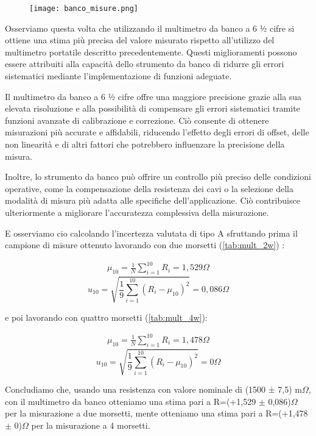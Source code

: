 \begin{figure}[h]
    \centering
    \texttt{[image: banco\_misure.png]}
    \label{fig:range}
\end{figure}
\FloatBarrier

Osserviamo questa volta che utilizzando il multimetro da banco a 6 ½ cifre si ottiene una stima più precisa del valore misurato rispetto all'utilizzo del multimetro portatile descritto precedentemente. Questi miglioramenti possono essere attribuiti alla capacità dello strumento da banco di ridurre gli errori sistematici mediante l'implementazione di funzioni adeguate.

Il multimetro da banco a 6 ½ cifre offre una maggiore precisione grazie alla sua elevata risoluzione e alla possibilità di compensare gli errori sistematici tramite funzioni avanzate di calibrazione e correzione. Ciò consente di ottenere misurazioni più accurate e affidabili, riducendo l'effetto degli errori di offset, delle non linearità e di altri fattori che potrebbero influenzare la precisione della misura.

Inoltre, lo strumento da banco può offrire un controllo più preciso delle condizioni operative, come la compensazione della resistenza dei cavi o la selezione della modalità di misura più adatta alle specifiche dell'applicazione. Ciò contribuisce ulteriormente a migliorare l'accuratezza complessiva della misurazione.

E osserviamo cio calcolando l'incertezza valutata di tipo A sfruttando prima il campione di misure ottenuto lavorando con due morsetti (\ref{tab:mult_2w}) :

\begin{align*}
    \mu_{10}=\frac{1}{N}\sum_{i=1}^{10}R_{i}=1,529\Omega
\end{align*}
\begin{equation*}
    u_{10}=\sqrt{\frac{1}{9}\sum_{i=1}^{10}(R_i-\mu_{10})^{2}}=0,086\Omega 
\end{equation*}
\FloatBarrier

e poi lavorando con quattro morsetti (\ref{tab:mult_4w}):

\begin{align*}
    \mu_{10}=\frac{1}{N}\sum_{i=1}^{10}R_{i}=1,478\Omega
\end{align*}
\begin{equation*}
    u_{10}=\sqrt{\frac{1}{9}\sum_{i=1}^{10}(R_i-\mu_{10})^{2}}=0\Omega 
\end{equation*}
\FloatBarrier

Concludiamo che, usando una resistenza con valore nominale di (1500 ± 7,5) m$\Omega$, con il multimetro da banco otteniamo una stima pari a R=(+1,529 $\pm$ 0,086)$\Omega$ per la misurazione a due morsetti, mente otteniamo una stima pari a R=(+1,478 $\pm$ 0)$\Omega$ per la misurazione a 4 morsetti.


